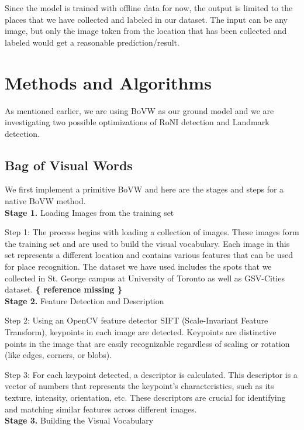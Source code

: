 \documentclass[conference]{IEEEtran}
\begin{document}
Since the model is trained with offline data for now, the output is limited to the places that we have collected and labeled in our dataset. The input can be any image, but only the image taken from the location that has been collected and labeled would get a reasonable prediction/result.

\section{Methods and Algorithms}

As mentioned earlier, we are using BoVW as our ground model and we are investigating two possible optimizations of RoNI detection and Landmark detection.

\subsection{Bag of Visual Words}

We first implement a primitive BoVW and here are the stages and steps for a native BoVW method. \\

\textbf{Stage 1.} Loading Images from the training set

Step 1: The process begins with loading a collection of images. These images form the training set and are used to build the visual vocabulary. Each image in this set represents a different location and contains various features that can be used for place recognition. The dataset we have used includes the spots that we collected in St. George campus at University of Toronto as well as GSV-Cities dataset. \textbf{ \{ reference missing \} }
\\

\textbf{Stage 2.} Feature Detection and Description

Step 2: Using an OpenCV feature detector SIFT (Scale-Invariant Feature Transform), keypoints in each image are detected. Keypoints are distinctive points in the image that are easily recognizable regardless of scaling or rotation (like edges, corners, or blobs).

Step 3: For each keypoint detected, a descriptor is calculated. This descriptor is a vector of numbers that represents the keypoint's characteristics, such as its texture, intensity, orientation, etc. These descriptors are crucial for identifying and matching similar features across different images.\\

\textbf{Stage 3.} Building the Visual Vocabulary
\end{document}
